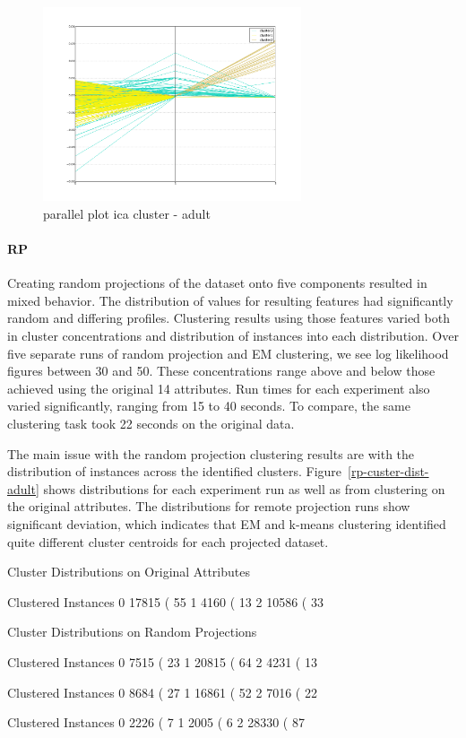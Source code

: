 \documentclass{sig-alternate}
\begin{document}
\begin{figure}[!htbp]
    \centering
    \includegraphics[width=3in]{part2/adult/parallel-ica-cluster.pdf}
    \caption{parallel plot ica cluster - adult\label{parallel-ica-cluster}}
\end{figure} 

\paragraph{RP}

Creating random projections of the dataset onto five components resulted in mixed behavior. The distribution of values for resulting features had significantly random and differing profiles. Clustering results using those features varied both in cluster concentrations and distribution of instances into each distribution. Over five separate runs of random projection and EM clustering, we see log likelihood figures between 30 and 50. These concentrations range above and below those achieved using the original 14 attributes. Run times for each experiment also varied significantly, ranging from 15 to 40 seconds. To compare, the same clustering task took 22 seconds on the original data.

The main issue with the random projection clustering results are with the distribution of instances across the identified clusters. Figure~\ref{rp-custer-dist-adult} shows distributions for each experiment run as well as from clustering on the original attributes. The distributions for remote projection runs show significant deviation, which indicates that EM and k-means clustering identified quite different cluster centroids for each projected dataset.

\begin{verbbox}
Cluster Distributions on Original Attributes

Clustered Instances
0      17815 ( 55%
1       4160 ( 13%
2      10586 ( 33%


Cluster Distributions on Random Projections

Clustered Instances
0       7515 ( 23%
1      20815 ( 64%
2       4231 ( 13%

Clustered Instances
0       8684 ( 27%
1      16861 ( 52%
2       7016 ( 22%

Clustered Instances
0       2226 (  7%
1       2005 (  6%
2      28330 ( 87%
\end{verbbox}
\end{document}
